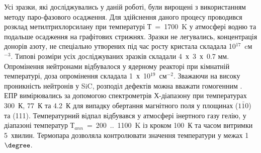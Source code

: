 Усі зразки, які досліджувались у даній роботі, були вирощені з використанням методу паро-фазового осадження. Для здійснення даного процесу проводився розклад метилтрихлорсилану при температурі Т~=~1700~K у атмосфері водню та подальше осадження на графітових стрижнях. Зразки не легувались, концентрація донорів азоту, не спеціально утворених під час росту кристала складала 10$^{17}$~cм$^{-3}$. Типові розміри усіх досліджуваних зразків складали 4~х~3~х~0.7 мм. Опромінення нейтронами відбувалося у ядерному реакторі при кімнатній температурі, доза опромінення складала 1~х~10$^{19}$~см$^{-2}$. Зважаючи на високу проникність нейтронів у SiC, розподіл дефектів можна вважати гомогенним \citep{neut}.\\
 ЕПР вимірювались за допомогою спектрометрів Х-діапазону при температурах 300~К, 77~К та 4.2~К для випадку обертання магнітного поля у площинах ($1\bar{1}0$) та (111). Температурний відпал відбувався у атмосфері інертного газу гелію, у діапазоні температур Т$_{ann}$~=~200~..~1100~K із кроком 100~К та часом витримки 5~хвилин. Термопара дозволяла контролювати значення температури у межах 1$\degree$.
